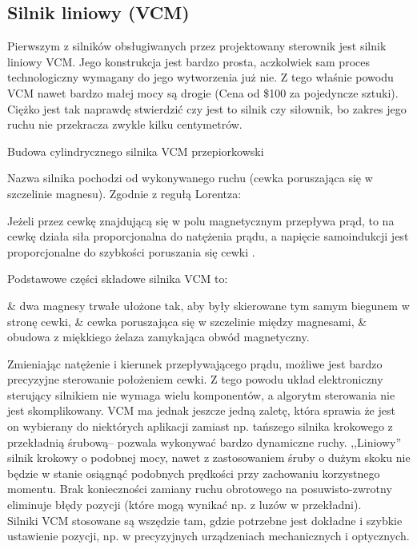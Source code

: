 \subsection{Silnik liniowy (VCM)}

Pierwszym z silników obsługiwanych przez projektowany sterownik jest silnik liniowy VCM. Jego konstrukcja jest bardzo prosta, aczkolwiek sam proces technologiczny wymagany do jego wytworzenia już nie. Z tego właśnie powodu VCM nawet bardzo małej mocy są drogie (Cena od \$100 za pojedyncze sztuki). Ciężko jest tak naprawdę stwierdzić czy jest to silnik czy siłownik, bo zakres jego ruchu nie przekracza zwykle kilku centymetrów.

	{Budowa cylindrycznego silnika VCM}
	{przepiorkowski}

Nazwa silnika pochodzi od wykonywanego ruchu (cewka poruszająca się w szczelinie magnesu). Zgodnie z regułą Lorentza:

\begin{defn}
	Jeżeli przez cewkę znajdującą się w polu magnetycznym przepływa prąd, to na cewkę działa siła proporcjonalna do natężenia prądu, a napięcie samoindukcji jest proporcjonalne do szybkości poruszania się cewki \cite{przepiorkowski}.
\end{defn}

Podstawowe części składowe silnika VCM to:
\begin{easylist}
	& dwa magnesy trwałe ułożone tak, aby były skierowane tym samym biegunem w stronę cewki,
	& cewka poruszająca się w szczelinie między magnesami,
	& obudowa z miękkiego żelaza zamykająca obwód magnetyczny.
	\\
\end{easylist}

Zmieniając natężenie i kierunek przepływającego prądu, możliwe jest bardzo precyzyjne sterowanie położeniem cewki. Z tego powodu układ elektroniczny sterujący silnikiem nie wymaga wielu komponentów, a algorytm sterowania nie jest skomplikowany. VCM ma jednak jeszcze jedną zaletę, która sprawia że jest on wybierany do niektórych aplikacji zamiast np. tańszego silnika krokowego z przekładnią śrubową-- pozwala wykonywać bardzo dynamiczne ruchy. ,,Liniowy'' silnik krokowy o podobnej mocy, nawet z zastosowaniem śruby o dużym skoku nie będzie w stanie osiągnąć podobnych prędkości przy zachowaniu korzystnego momentu. Brak konieczności zamiany ruchu obrotowego na posuwisto-zwrotny eliminuje błędy pozycji (które mogą wynikać np. z luzów w przekładni). \\
Silniki VCM stosowane są wszędzie tam, gdzie potrzebne jest dokładne i szybkie ustawienie pozycji, np. w precyzyjnych urządzeniach mechanicznych i optycznych. 

